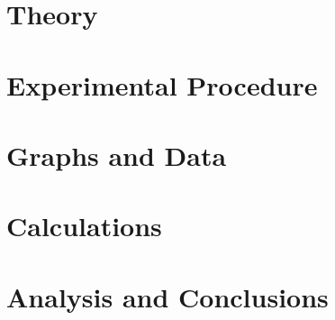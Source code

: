 \documentclass[12pt]{article}   	%
\begin{document}
\section{Theory}
\section{Experimental Procedure}
\section{Graphs and Data}
\section{Calculations}
\section{Analysis and Conclusions}

\end{document}
